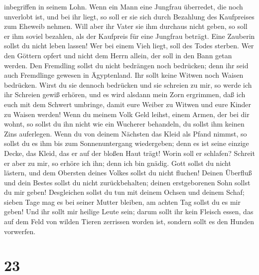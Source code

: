 inbegriffen in seinem Lohn.  Wenn ein Mann eine Jungfrau
überredet, die noch unverlobt ist, und bei ihr liegt, so soll er sie
sich durch Bezahlung des Kaufpreises zum Eheweib nehmen. 
Will aber ihr Vater sie ihm durchaus nicht geben, so soll er ihm soviel
bezahlen, als der Kaufpreis für eine Jungfrau beträgt. 
Eine Zauberin sollst du nicht leben lassen!  Wer bei
einem Vieh liegt, soll des Todes sterben.  Wer den
Göttern opfert und nicht dem Herrn allein, der soll in den Bann getan
werden.  Den Fremdling sollst du nicht bedrängen noch
bedrücken; denn ihr seid auch Fremdlinge gewesen in Ägyptenland.
 Ihr sollt keine Witwen noch Waisen bedrücken.
 Wirst du sie dennoch bedrücken und sie schreien zu mir,
so werde ich ihr Schreien gewiß erhören,  und es wird
alsdann mein Zorn ergrimmen, daß ich euch mit dem Schwert umbringe,
damit eure Weiber zu Witwen und eure Kinder zu Waisen werden!
 Wenn du meinem Volk Geld leihst, einem Armen, der bei
dir wohnt, so sollst du ihn nicht wie ein Wucherer behandeln, du sollst
ihm keinen Zins auferlegen.  Wenn du von deinem Nächsten
das Kleid als Pfand nimmst, so sollst du es ihm bis zum Sonnenuntergang
wiedergeben;  denn es ist seine einzige Decke, das Kleid,
das er auf der bloßen Haut trägt! Worin soll er schlafen? Schreit er
aber zu mir, so erhöre ich ihn; denn ich bin gnädig. 
Gott sollst du nicht lästern, und dem Obersten deines Volkes sollst du
nicht fluchen!  Deinen Überfluß und dein Bestes sollst du
nicht zurückbehalten; deinen erstgeborenen Sohn sollst du mir geben!
 Desgleichen sollst du tun mit deinem Ochsen und deinem
Schaf; sieben Tage mag es bei seiner Mutter bleiben, am achten Tag
sollst du es mir geben!  Und ihr sollt mir heilige Leute
sein; darum sollt ihr kein Fleisch essen, das auf dem Feld von wilden
Tieren zerrissen worden ist, sondern sollt es den Hunden vorwerfen.

\hypertarget{section-22}{%
\section{23}\label{section-22}}

